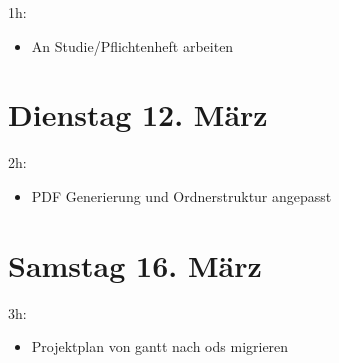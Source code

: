 1h:

\begin{itemize}
\tightlist
\item
  An Studie/Pflichtenheft arbeiten
\end{itemize}

\section{Dienstag 12. März}\label{dienstag-12.muxe4rz}

2h:

\begin{itemize}
\tightlist
\item
  PDF Generierung und Ordnerstruktur angepasst
\end{itemize}

\section{Samstag 16. März}\label{samstag-16.muxe4rz}

3h:

\begin{itemize}
\tightlist
\item
  Projektplan von gantt nach ods migrieren
\end{itemize}
